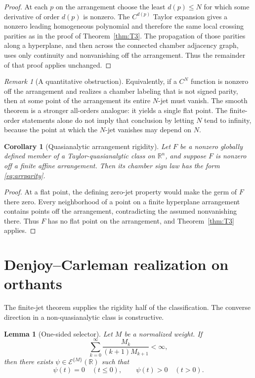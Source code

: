 \documentclass[11pt]{article}
\newtheorem{lemma}[theorem]{Lemma}
\newtheorem{corollary}[theorem]{Corollary}
\theoremstyle{definition}
\theoremstyle{remark}
\newtheorem{remark}[theorem]{Remark}
\newcommand{\R}{\mathbb{R}}
\begin{document}
\begin{proof}
At each $p$ on the arrangement choose the least $d(p)\le N$ for which some derivative of order $d(p)$ is nonzero. The $C^{d(p)}$ Taylor expansion gives a nonzero leading homogeneous polynomial and therefore the same local crossing parities as in the proof of Theorem~\ref{thm:T3}. The propagation of those parities along a hyperplane, and then across the connected chamber adjacency graph, uses only continuity and nonvanishing off the arrangement. Thus the remainder of that proof applies unchanged.
\end{proof}

\begin{remark}[A quantitative obstruction]
Equivalently, if a $C^N$ function is nonzero off the arrangement and realizes a chamber labeling that is not signed parity, then at some point of the arrangement its entire $N$-jet must vanish. The smooth theorem is a stronger all-orders analogue: it yields a single flat point. The finite-order statements alone do not imply that conclusion by letting $N$ tend to infinity, because the point at which the $N$-jet vanishes may depend on $N$.
\end{remark}

\begin{corollary}[Quasianalytic arrangement rigidity]\label{cor:quasiarr}
Let $F$ be a nonzero globally defined member of a Taylor-quasianalytic class on $\R^n$, and suppose $F$ is nonzero off a finite affine arrangement. Then its chamber sign law has the form \eqref{eq:arrparity}.
\end{corollary}

\begin{proof}
At a flat point, the defining zero-jet property would make the germ of $F$ there zero. Every neighborhood of a point on a finite hyperplane arrangement contains points off the arrangement, contradicting the assumed nonvanishing there. Thus $F$ has no flat point on the arrangement, and Theorem~\ref{thm:T3} applies.
\end{proof}

\section{Denjoy--Carleman realization on orthants}\label{sec:dc}

The finite-jet theorem supplies the rigidity half of the classification. The converse direction in a non-quasianalytic class is constructive.

\begin{lemma}[One-sided selector]\label{thm:T4}
Let $M$ be a normalized weight. If
\begin{equation}\label{eq:nonq}
 \sum_{k=0}^{\infty}\frac{M_k}{(k+1)M_{k+1}}<\infty,
\end{equation}
then there exists $\psi\in\mathcal{E}^{\{M\}}(\R)$ such that
\[
 \psi(t)=0\quad(t\le0),
 \qquad
 \psi(t)>0\quad(t>0).
\]
\end{lemma}
\end{document}

